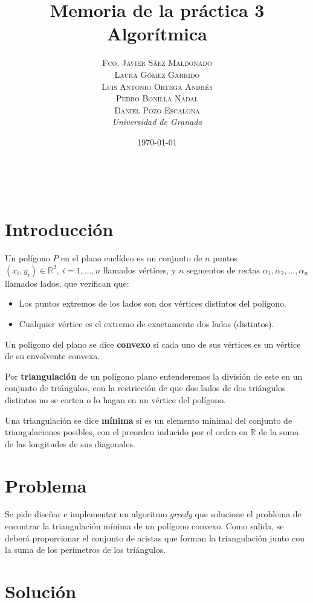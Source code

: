 \documentclass[a4paper, 11pt]{article}
\title{\textbf{Memoria de la práctica 3}\\ %
Algorítmica} %
\author{\textsc{Fco. Javier Sáez Maldonado}\\ %
\textsc{Laura Gómez Garrido}\\
\textsc{Luis Antonio Ortega Andrés}\\
\textsc{Pedro Bonilla Nadal}\\
\textsc{Daniel Pozo Escalona}\vspace{2cm}
\\{\textit{Universidad de Granada}}} %
\date{\today} %
\makeatletter
\renewcommand{\maketitle}{
  \begin{flushright} %
  
  {\LARGE\@title} %
  
  \vspace{50pt} %
  
  {\large\@author} %
  \\\@date %
  \vspace{40pt} %
  \end{flushright}
}
\makeatother
\begin{document}
\maketitle %


{\parskip=2pt
  \tableofcontents
}
\pagebreak



\section{Introducción}

Un polígono $P$ en el plano euclídeo es un conjunto de $n$ puntos $(x_i, y_i) \in \mathbb{R}^2,\ i=1,\dots,n$ llamados vértices, y $n$ segmentos de rectas ${\alpha_1 , \alpha_2 ,\dots, \alpha_n }$ llamados lados, que verifican que:

\begin{itemize}
	\item Los puntos extremos de los lados son dos vértices distintos del polígono. 
	\item Cualquier vértice es el extremo de exactamente dos lados (distintos).
\end{itemize}

Un polígono del plano se dice \textbf{convexo} si cada uno de sus vértices es un vértice de su envolvente convexa.

 Por \textbf{triangulación} de un polígono plano entenderemos la división de este en un conjunto de triángulos, con la restricción de que dos lados de dos triángulos distintos no se corten o lo hagan en un vértice del polígono.

Una triangulación se dice \textbf{mínima} si es un elemento minimal del conjunto de triangulaciones posibles, con el preorden inducido por el orden en $\mathbb{R}$ de la suma de las longitudes de sus diagonales.


\section{Problema}

Se pide diseñar e implementar un algoritmo \textit{greedy} que solucione el problema de encontrar la triangulación mínima de un polígono convexo. Como salida, se deberá proporcionar el conjunto de aristas que forman la triangulación junto con la suma de los perímetros de los triángulos.

\section{Solución}
\end{document}
